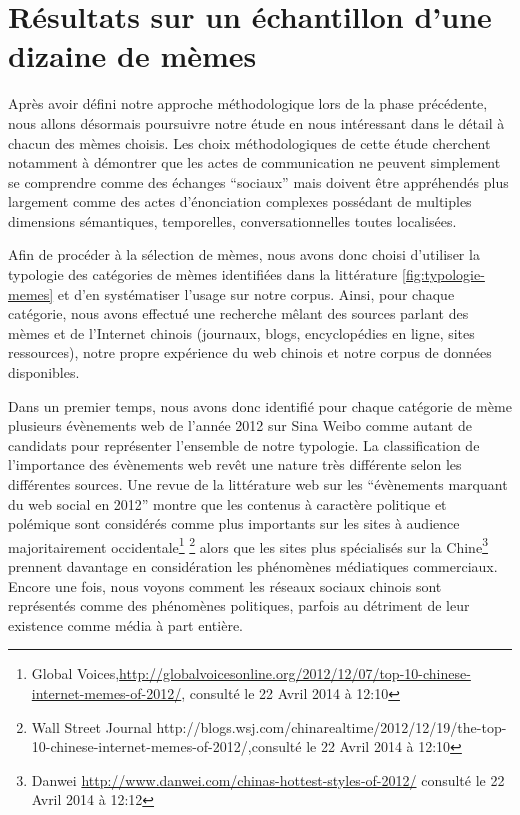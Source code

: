 \section{Résultats sur un échantillon d'une dizaine de mèmes}

Après avoir défini notre approche méthodologique lors de la phase précédente, nous allons désormais poursuivre notre étude en nous intéressant dans le détail à chacun des mèmes choisis. Les choix méthodologiques de cette étude cherchent notamment à démontrer que les actes de communication ne peuvent simplement se comprendre comme des échanges {\textquotedblleft}sociaux{\textquotedblright} mais doivent être appréhendés plus largement comme des actes d{\textquoteright}énonciation complexes possédant de multiples dimensions sémantiques, temporelles, conversationnelles toutes localisées.

Afin de procéder à la sélection de mèmes, nous avons donc choisi d{\textquoteright}utiliser la typologie des catégories de mèmes identifiées dans la littérature \ref{fig:typologie-memes} et d{\textquoteright}en systématiser l{\textquoteright}usage sur notre corpus. Ainsi, pour chaque catégorie, nous avons effectué une recherche m\^elant des sources parlant des mèmes et de l{\textquoteright}Internet chinois (journaux, blogs, encyclopédies en ligne, sites ressources), notre propre expérience du web chinois et notre corpus de données disponibles. 

Dans un premier temps, nous avons donc identifié pour chaque catégorie de mème plusieurs évènements web de l{\textquoteright}année 2012 sur Sina Weibo comme autant de candidats pour représenter l{\textquoteright}ensemble de notre typologie. La classification de l{\textquoteright}importance des évènements web rev\^et une nature très différente selon les différentes sources. Une revue de la littérature web sur les {\textquotedblleft}évènements marquant du web social en 2012{\textquotedblright} montre que les contenus à caractère politique et polémique sont considérés comme plus importants sur les sites à audience majoritairement occidentale\footnote{Global Voices,\url{http://globalvoicesonline.org/2012/12/07/top-10-chinese-internet-memes-of-2012/}, consulté le 22 Avril 2014 à 12:10} \footnote{ Wall Street Journal http://blogs.wsj.com/chinarealtime/2012/12/19/the-top-10-chinese-internet-memes-of-2012/,consulté le 22 Avril 2014 à 12:10 } alors que les sites plus spécialisés sur la Chine\footnote{ Danwei \url{http://www.danwei.com/chinas-hottest-styles-of-2012/} consulté le 22 Avril 2014 à 12:12} prennent davantage en considération les phénomènes médiatiques commerciaux. Encore une fois, nous voyons comment les réseaux sociaux chinois sont représentés comme des phénomènes politiques, parfois au détriment de leur existence comme média à part entière. 


